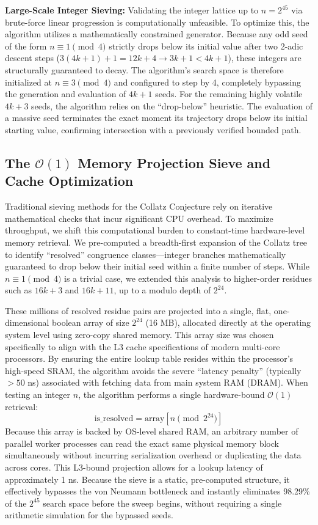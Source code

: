 \documentclass[11pt, a4paper]{article}
\theoremstyle{definition}
\begin{document}
\textbf{Large-Scale Integer Sieving:} Validating the integer lattice up to $n=2^{45}$ via brute-force linear progression is computationally unfeasible. To optimize this, the algorithm utilizes a mathematically constrained generator. Because any odd seed of the form $n \equiv 1 \pmod 4$ strictly drops below its initial value after two 2-adic descent steps ($3(4k+1)+1 = 12k+4 \rightarrow 3k+1 < 4k+1$), these integers are structurally guaranteed to decay. The algorithm's search space is therefore initialized at $n \equiv 3 \pmod 4$ and configured to step by 4, completely bypassing the generation and evaluation of $4k+1$ seeds. For the remaining highly volatile $4k+3$ seeds, the algorithm relies on the ``drop-below'' heuristic. The evaluation of a massive seed terminates the exact moment its trajectory drops below its initial starting value, confirming intersection with a previously verified bounded path.

\subsection{The \texorpdfstring{$\mathcal{O}(1)$}{O(1)} Memory Projection Sieve and Cache Optimization}

Traditional sieving methods for the Collatz Conjecture rely on iterative mathematical checks that incur significant CPU overhead. To maximize throughput, we shift this computational burden to constant-time hardware-level memory retrieval. We pre-computed a breadth-first expansion of the Collatz tree to identify ``resolved'' congruence classes—integer branches mathematically guaranteed to drop below their initial seed within a finite number of steps. While $n \equiv 1 \pmod{4}$ is a trivial case, we extended this analysis to higher-order residues such as $16k+3$ and $16k+11$, up to a modulo depth of $2^{24}$.

These millions of resolved residue pairs are projected into a single, flat, one-dimensional boolean array of size $2^{24}$ (16 MB), allocated directly at the operating system level using zero-copy shared memory. This array size was chosen specifically to align with the L3 cache specifications of modern multi-core processors. By ensuring the entire lookup table resides within the processor's high-speed SRAM, the algorithm avoids the severe ``latency penalty'' (typically $>50$ ns) associated with fetching data from main system RAM (DRAM). When testing an integer $n$, the algorithm performs a single hardware-bound $\mathcal{O}(1)$ retrieval: 
\begin{equation}
\text{is\_resolved} = \text{array}[n \pmod{2^{24}}]
\end{equation}
Because this array is backed by OS-level shared RAM, an arbitrary number of parallel worker processes can read the exact same physical memory block simultaneously without incurring serialization overhead or duplicating the data across cores. This L3-bound projection allows for a lookup latency of approximately 1 ns. Because the sieve is a static, pre-computed structure, it effectively bypasses the von Neumann bottleneck and instantly eliminates 98.29\% of the $2^{45}$ search space before the sweep begins, without requiring a single arithmetic simulation for the bypassed seeds.
\end{document}

